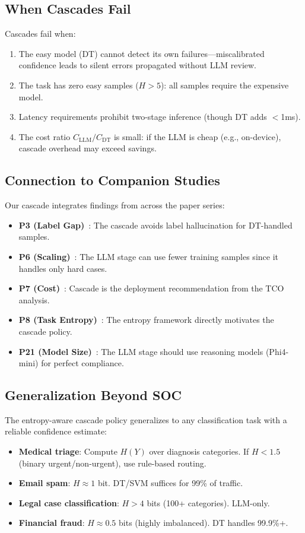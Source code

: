 \documentclass[review,3p]{elsarticle}
\begin{document}
\subsection{When Cascades Fail}
Cascades fail when:
\begin{enumerate}
\item The easy model (DT) cannot detect its own failures---miscalibrated confidence leads to silent errors propagated without LLM review.
\item The task has zero easy samples ($H>5$): all samples require the expensive model.
\item Latency requirements prohibit two-stage inference (though DT adds $<$1ms).
\item The cost ratio $C_\text{LLM}/C_\text{DT}$ is small: if the LLM is cheap (e.g., on-device), cascade overhead may exceed savings.
\end{enumerate}

\subsection{Connection to Companion Studies}
Our cascade integrates findings from across the paper series:
\begin{itemize}
\item \textbf{P3 (Label Gap)}~\cite{p3}: The cascade avoids label hallucination for DT-handled samples.
\item \textbf{P6 (Scaling)}~\cite{p6}: The LLM stage can use fewer training samples since it handles only hard cases.
\item \textbf{P7 (Cost)}~\cite{p7}: Cascade is the deployment recommendation from the TCO analysis.
\item \textbf{P8 (Task Entropy)}~\cite{p8}: The entropy framework directly motivates the cascade policy.
\item \textbf{P21 (Model Size)}~\cite{p21}: The LLM stage should use reasoning models (Phi4-mini) for perfect compliance.
\end{itemize}

\subsection{Generalization Beyond SOC}
The entropy-aware cascade policy generalizes to any classification task with a reliable confidence estimate:
\begin{itemize}
\item \textbf{Medical triage}: Compute $H(Y)$ over diagnosis categories. If $H<1.5$ (binary urgent/non-urgent), use rule-based routing.
\item \textbf{Email spam}: $H \approx 1$ bit. DT/SVM suffices for 99\% of traffic.
\item \textbf{Legal case classification}: $H>4$ bits (100+ categories). LLM-only.
\item \textbf{Financial fraud}: $H \approx 0.5$ bits (highly imbalanced). DT handles 99.9\%+.
\end{itemize}
\end{document}
